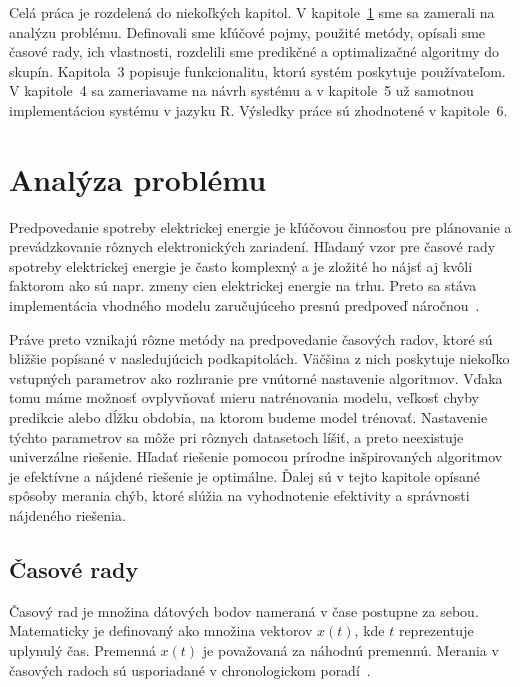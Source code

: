 \documentclass[a4paper,slovak,12pt,appendix]{article}
\begin{document}
Celá práca je rozdelená do niekoľkých kapitol. V
kapitole~\ref{problem-analysis} sme sa zamerali na analýzu problému. Definovali
sme kľúčové pojmy, použité metódy, opísali sme časové rady, ich vlastnosti,
rozdelili sme predikčné a optimalizačné algoritmy do skupín.
Kapitola~3 popisuje funkcionalitu, ktorú systém poskytuje                       %
používateľom. V kapitole~4 sa zameriavame na návrh systému                      %
a v kapitole~5 už samotnou implementáciou systému v jazyku R.                   %
Výsledky práce sú zhodnotené v kapitole~6.                                      %


\newpage
\section{Analýza problému}
\label{problem-analysis}
Predpovedanie spotreby elektrickej energie je kľúčovou činnosťou pre plánovanie
a prevádzkovanie rôznych elektronických zariadení. Hľadaný vzor pre časové
rady spotreby elektrickej energie je často komplexný a je zložité ho nájsť aj
kvôli faktorom ako sú napr. zmeny cien elektrickej energie na trhu. Preto sa
stáva implementácia vhodného modelu zaručujúceho presnú predpoveď
náročnou~\cite{Mahalakshmi2016}.

Práve preto vznikajú rôzne metódy na predpovedanie časových radov, ktoré sú
bližšie popísané v nasledujúcich podkapitolách. Väčšina z nich poskytuje
niekoľko vstupných parametrov ako rozhranie pre vnútorné nastavenie algoritmov.
Vďaka tomu máme možnosť ovplyvňovať mieru natrénovania modelu, veľkosť chyby
predikcie alebo dĺžku obdobia, na ktorom budeme model trénovať. Nastavenie
týchto parametrov sa môže pri rôznych datasetoch líšiť, a preto neexistuje
univerzálne riešenie. Hľadať riešenie pomocou prírodne inšpirovaných
algoritmov je efektívne a nájdené riešenie je optimálne. Ďalej sú v tejto
kapitole opísané spôsoby merania chýb, ktoré slúžia na vyhodnotenie efektivity
a správnosti nájdeného riešenia.


\subsection{Časové rady}
Časový rad je množina dátových bodov nameraná v čase postupne za sebou.
Matematicky je definovaný ako množina vektorov $x(t)$, kde $t$ reprezentuje
uplynulý čas. Premenná $x(t)$ je považovaná za náhodnú premennú.
Merania v časových radoch sú usporiadané v chronologickom
poradí~\cite{Agrawal2013}.
\end{document}
